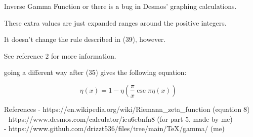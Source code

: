 \documentclass[12pt]{article}
\begin{document}
\begin{section}{Inverse Gamma Function}
	or there is a bug in Desmos' graphing calculations.

	These extra values are just expanded ranges around the positive integers.

	It doesn't change the rule described in (39), however.

	See reference 2 for more information.

	going a different way after (35) gives the following equation:

	\begin{equation}
		\eta(x)=1-\eta\left(\dfrac\pi x\csc\pi\eta(x)\right)
	\end{equation}

\end{section}

\pagebreak
\begin{section}{References}
	- https://en.wikipedia.org/wiki/Riemann\_zeta\_function (equation 8)\\
	- https://www.desmos.com/calculator/ieu6ebnfn8 (for part 5, made by me)\\
	- https://www.github.com/drizzt536/files/tree/main/TeX/gamma/ (me)
\end{section}
\end{document}
